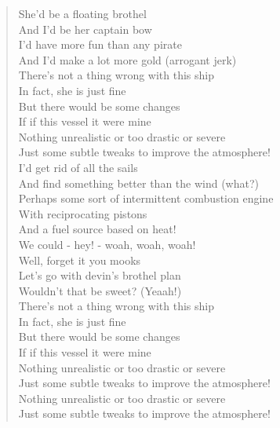 \documentclass[11pt]{article}
\begin{document}
\begin{verse}
She'd be a floating brothel\\
And I'd be her captain bow\\
I'd have more fun than any pirate\\
And I'd make a lot more gold (arrogant jerk)\\
\vspace*{1em}
There's not a thing wrong with this ship\\
In fact, she is just fine\\
But there would be some changes\\
If if this vessel it were mine\\
Nothing unrealistic or too drastic or severe\\
Just some subtle tweaks to improve the atmosphere!\\
\vspace*{1em}
I'd get rid of all the sails\\
And find something better than the wind (what?)\\
Perhaps some sort of intermittent combustion engine\\
With reciprocating pistons\\
And a fuel source based on heat!\\
We could - hey! - woah, woah, woah!\\
Well, forget it you mooks\\
Let's go with devin's brothel plan\\
Wouldn't that be sweet? (Yeaah!)\\
\vspace*{1em}
There's not a thing wrong with this ship\\
In fact, she is just fine\\
But there would be some changes\\
If if this vessel it were mine\\
Nothing unrealistic or too drastic or severe\\
Just some subtle tweaks to improve the atmosphere!\\
Nothing unrealistic or too drastic or severe\\
Just some subtle tweaks to improve the atmosphere!\\
\end{verse}
\clearpage
\end{document}

